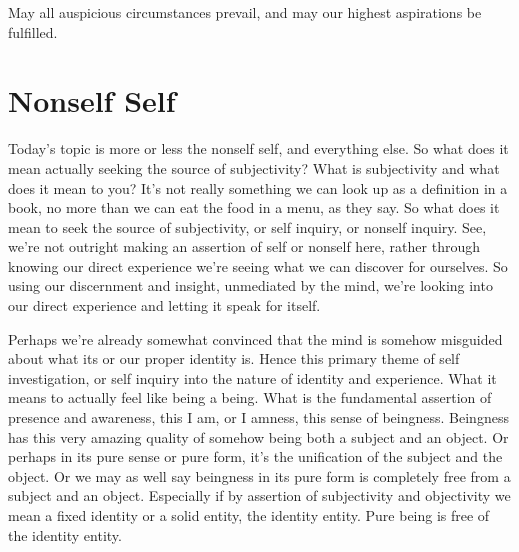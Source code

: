 \documentclass[12pt,openany]{book}
\begin{document}
May all auspicious circumstances prevail, and may our highest aspirations be fulfilled.

\medskip

\begin{figure}[h]
    \centering
\end{figure}

\chapter*{Nonself Self}

Today's topic is more or less the nonself self, and everything else. So what does it mean actually seeking the source of subjectivity? What is subjectivity and what does it mean to you? It's not really something we can look up as a definition in a book, no more than we can eat the food in a menu, as they say. So what does it mean to seek the source of subjectivity, or self inquiry, or nonself inquiry. See, we're not outright making an assertion of self or nonself here, rather through knowing our direct experience we're seeing what we can discover for ourselves. So using our discernment and insight, unmediated by the \linebreak mind, we're looking into our direct experience and letting it speak for itself.

Perhaps we're already somewhat convinced that the mind is somehow misguided about what its or our proper identity is. Hence this primary theme of self investigation, or self inquiry into the nature of identity and experience. What it means to actually feel like being a being. What is the fundamental assertion of presence and awareness, this I am, or I amness, this sense of beingness. Beingness has this very amazing quality of somehow being both a subject and an object. Or perhaps in its pure sense or pure form, it's the unification of the subject and the object. Or we may as well say beingness in its pure form is completely free from a subject and an object. Especially if by assertion of subjectivity and objectivity we mean a fixed identity or a solid entity, the identity entity. Pure being is free of the identity entity.
\end{document}
